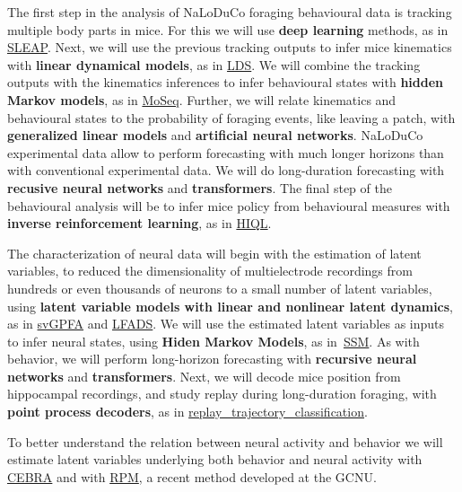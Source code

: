 The first step in the analysis of NaLoDuCo foraging behavioural data is
tracking multiple body parts in mice. For this we will use \textbf{deep
learning} methods, as in \href{https://github.com/talmolab/sleap}{SLEAP}.
%
Next, we will use the previous tracking outputs to infer mice kinematics with
\textbf{linear dynamical models}, as in
\href{https://github.com/joacorapela/lds}{LDS}.
%
We will combine the tracking outputs with the kinematics inferences to infer
behavioural states with \textbf{hidden Markov models}, as in
\href{https://dattalab.github.io/moseq2-website/index.html}{MoSeq}.
%
Further, we will relate kinematics and behavioural states to the probability of
foraging events, like leaving a patch, with \textbf{generalized linear models}
and \textbf{artificial neural networks}.
%
NaLoDuCo experimental data allow to perform forecasting with much longer
horizons than with conventional experimental data. We will do
long-duration forecasting with \textbf{recusive neural networks} and
\textbf{transformers}.
%
The final step of the behavioural analysis will be to infer mice policy from
behavioural measures with \textbf{inverse reinforcement learning}, as in
\href{https://github.com/haozhu10015/hiql}{HIQL}.

The characterization of neural data will begin with the estimation of
latent variables, to reduced the dimensionality of multielectrode
recordings from hundreds or even thousands of neurons to a small number of
latent variables, using \textbf{latent variable models with
linear and
nonlinear latent dynamics}, as in
\href{https://github.com/joacorapela/svGPFA}{svGPFA} and
\href{https://snel.ai/resources/lfads/}{LFADS}.
%
We will use the estimated latent variables as inputs to infer neural
states, using \textbf{Hiden Markov Models}, as
in~\href{https://github.com/lindermanlab/ssm}{SSM}.
%
As with behavior, we will perform long-horizon forecasting with
\textbf{recursive neural networks} and \textbf{transformers}.
%
Next, we will decode mice position from hippocampal recordings, and
study replay during long-duration foraging, with
\textbf{point process decoders}, as in
\href{https://github.com/Eden-Kramer-Lab/replay_trajectory_classification}{replay\_trajectory\_classification}.

To better understand the relation between neural activity and behavior we will
estimate latent variables underlying both behavior and neural activity with
\href{https://cebra.ai/}{CEBRA} and with
\href{https://github.com/gatsby-sahani/rpm-aistats-2023}{RPM}, a recent method developed
at the GCNU.

